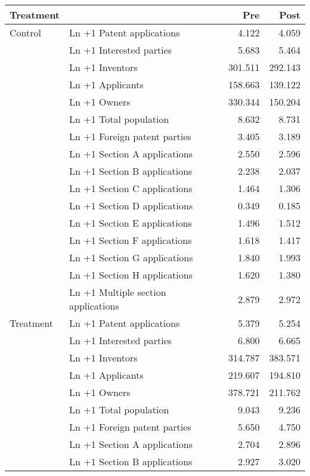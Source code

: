 
\begin{tabular}[t]{llrr}
\toprule
Treatment &   & Pre & Post\\
\midrule
Control & Ln +1 Patent applications & \num{4.122} & \num{4.059}\\
 & Ln +1 Interested parties & \num{5.683} & \num{5.464}\\
 & Ln +1 Inventors & \num{301.511} & \num{292.143}\\
 & Ln +1 Applicants & \num{158.663} & \num{139.122}\\
 & Ln +1 Owners & \num{330.344} & \num{150.204}\\
 & Ln +1 Total population & \num{8.632} & \num{8.731}\\
 & Ln +1 Foreign patent parties & \num{3.405} & \num{3.189}\\
 & Ln +1 Section A applications & \num{2.550} & \num{2.596}\\
 & Ln +1 Section B applications & \num{2.238} & \num{2.037}\\
 & Ln +1 Section C applications & \num{1.464} & \num{1.306}\\
 & Ln +1 Section D applications & \num{0.349} & \num{0.185}\\
 & Ln +1 Section E applications & \num{1.496} & \num{1.512}\\
 & Ln +1 Section F applications & \num{1.618} & \num{1.417}\\
 & Ln +1 Section G applications & \num{1.840} & \num{1.993}\\
 & Ln +1 Section H applications & \num{1.620} & \num{1.380}\\
 & Ln +1 Multiple section applications & \num{2.879} & \num{2.972}\\
Treatment & Ln +1 Patent applications & \num{5.379} & \num{5.254}\\
 & Ln +1 Interested parties & \num{6.800} & \num{6.665}\\
 & Ln +1 Inventors & \num{314.787} & \num{383.571}\\
 & Ln +1 Applicants & \num{219.607} & \num{194.810}\\
 & Ln +1 Owners & \num{378.721} & \num{211.762}\\
 & Ln +1 Total population & \num{9.043} & \num{9.236}\\
 & Ln +1 Foreign patent parties & \num{5.650} & \num{4.750}\\
 & Ln +1 Section A applications & \num{2.704} & \num{2.896}\\
 & Ln +1 Section B applications & \num{2.927} & \num{3.020}\\

\end{tabular}

